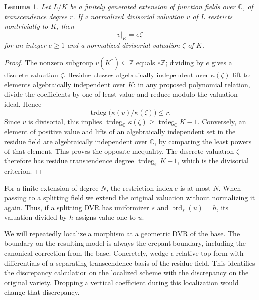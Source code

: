 \documentclass[11pt,reqno]{amsart}
\numberwithin{equation}{section}
\newtheorem{lemma}[theorem]{Lemma}
\theoremstyle{definition}
\theoremstyle{remark}
\newcommand{\C}{\mathbb C}
\newcommand{\Z}{\mathbb Z}
\newcommand{\ord}{\operatorname{ord}}
\newcommand{\trdeg}{\operatorname{trdeg}}
\begin{document}
\begin{lemma}\label{lem:restriction}
Let $L/K$ be a finitely generated extension of function fields over $\C$, of transcendence degree $r$. If a normalized divisorial valuation $v$ of $L$ restricts nontrivially to $K$, then
\[
 v|_K=e\zeta
\]
for an integer $e\ge1$ and a normalized divisorial valuation $\zeta$ of $K$.
\end{lemma}
\begin{proof}
The nonzero subgroup $v(K^*)\subseteq\Z$ equals $e\Z$; dividing by $e$ gives a discrete valuation $\zeta$. Residue classes algebraically independent over $\kappa(\zeta)$ lift to elements algebraically independent over $K$: in any proposed polynomial relation, divide the coefficients by one of least value and reduce modulo the valuation ideal. Hence
\[
 \trdeg\bigl(\kappa(v)/\kappa(\zeta)\bigr)\le r.
\]
Since $v$ is divisorial, this implies $\trdeg_\C\kappa(\zeta)\ge\trdeg_\C K-1$. Conversely, an element of positive value and lifts of an algebraically independent set in the residue field are algebraically independent over $\C$, by comparing the least powers of that element. This proves the opposite inequality. The discrete valuation $\zeta$ therefore has residue transcendence degree $\trdeg_\C K-1$, which is the divisorial criterion.
\end{proof}

For a finite extension of degree $N$, the restriction index $e$ is at most $N$. When passing to a splitting field we extend the original valuation without normalizing it again. Thus, if a splitting DVR has uniformizer $s$ and $\ord_s(u)=h$, its valuation divided by $h$ assigns value one to $u$.

We will repeatedly localize a morphism at a geometric DVR of the base. The boundary on the resulting model is always the crepant boundary, including the canonical correction from the base. Concretely, wedge a relative top form with differentials of a separating transcendence basis of the residue field. This identifies the discrepancy calculation on the localized scheme with the discrepancy on the original variety. Dropping a vertical coefficient during this localization would change that discrepancy.
\end{document}
